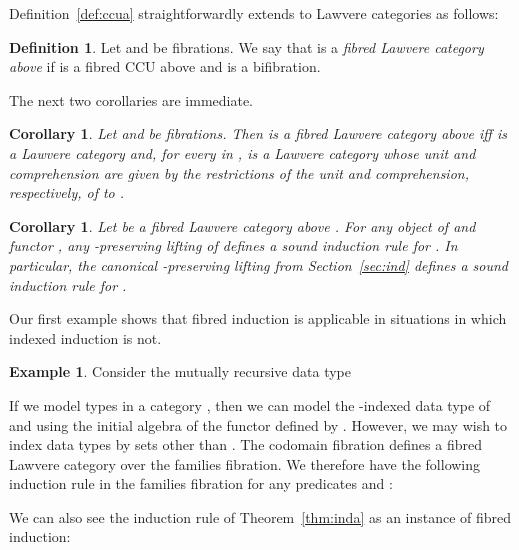 \documentclass{LMCS}
\theoremstyle{plain}
\newtheorem{corollary}[theorem]{Corollary}
\theoremstyle{remark}
\theoremstyle{definition}
\newtheorem{definition}[theorem]{Definition}
\newtheorem{example}[theorem]{Example}
\begin{document}
Definition~\ref{def:ccua} straightforwardly extends to Lawvere
categories as follows:

\begin{definition}\label{def:lwfiba}
  Let  and  be fibrations. We say that  is a
  {\em fibred Lawvere category above } if  is a fibred CCU above  
  and  is a bifibration.
\end{definition}

\noindent
The next two corollaries are immediate.

\begin{corollary}\label{cor:lwfaadj}
  Let  and  be fibrations. Then  is a fibred
  Lawvere category above  iff  is a Lawvere category and, for
  every  in ,  is a Lawvere category whose
  unit and comprehension are given by the restrictions of the unit and
  comprehension, respectively, of  to .
\end{corollary}

\begin{corollary}\label{cor:iind}
  Let  be a fibred Lawvere category above . For
  any object  of  and functor , any
  -preserving lifting  of  defines a
  sound induction rule for . In particular, the canonical
  -preserving lifting from Section~\ref{sec:ind} defines a sound
  induction rule for .
\end{corollary}

Our first example shows that fibred induction is applicable in
situations in which indexed induction is not.

\begin{example}
Consider the mutually recursive data type

\vspace*{-0.05in}



\vspace*{0.1in}

\noindent
If we model types in a category , then we can model the
-indexed data type of  and  using the initial algebra
of the functor  defined by .
However, we may wish to index data types by sets other than .
The codomain fibration  defines a
fibred Lawvere category over the families fibration.  We therefore
have the following induction rule in the families fibration for any
predicates  and :


\end{example}

\vspace*{0.1in}

We can also see the induction rule of Theorem~\ref{thm:inda} as an
instance of fibred induction:
\end{document}
